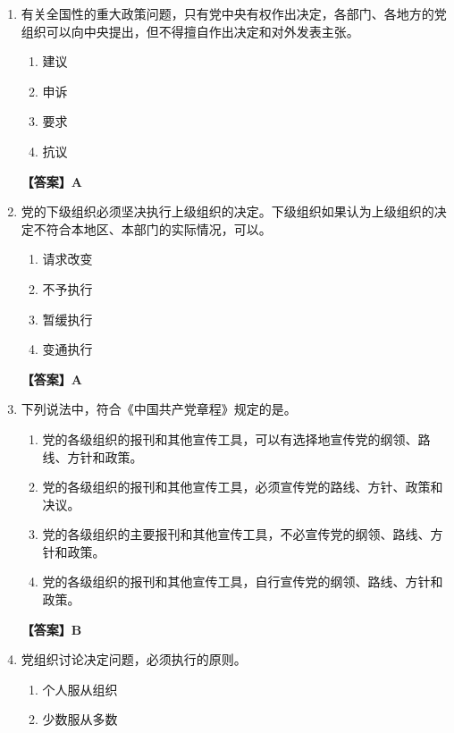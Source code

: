 \documentclass[UTF8,11pt,a4paper]{ctexart}
\begin{document}
\begin{enumerate}[label=\textbf{\arabic*.}, leftmargin=2.5em, itemsep=0.7em]
\item 有关全国性的重大政策问题，只有党中央有权作出决定，各部门、各地方的党组织可以向中央提出\allowbreak\underline{\hspace{4em}}，但不得擅自作出决定和对外发表主张。
\begin{enumerate}[label=\Alph*., leftmargin=2em, itemsep=0.1em, topsep=0.15em]
\item 建议
\item 申诉
\item 要求
\item 抗议
\end{enumerate}
\textbf{【答案】A}
\item 党的下级组织必须坚决执行上级组织的决定。下级组织如果认为上级组织的决定不符合本地区、本部门的实际情况，可以\allowbreak\underline{\hspace{4em}}。
\begin{enumerate}[label=\Alph*., leftmargin=2em, itemsep=0.1em, topsep=0.15em]
\item 请求改变
\item 不予执行
\item 暂缓执行
\item 变通执行
\end{enumerate}
\textbf{【答案】A}
\item 下列说法中，符合《中国共产党章程》规定的是\allowbreak\underline{\hspace{4em}}。
\begin{enumerate}[label=\Alph*., leftmargin=2em, itemsep=0.1em, topsep=0.15em]
\item 党的各级组织的报刊和其他宣传工具，可以有选择地宣传党的纲领、路线、方针和政策。
\item 党的各级组织的报刊和其他宣传工具，必须宣传党的路线、方针、政策和决议。
\item 党的各级组织的主要报刊和其他宣传工具，不必宣传党的纲领、路线、方针和政策。
\item 党的各级组织的报刊和其他宣传工具，自行宣传党的纲领、路线、方针和政策。
\end{enumerate}
\textbf{【答案】B}
\item 党组织讨论决定问题，必须执行\allowbreak\underline{\hspace{4em}}的原则。
\begin{enumerate}[label=\Alph*., leftmargin=2em, itemsep=0.1em, topsep=0.15em]
\item 个人服从组织
\item 少数服从多数

\end{enumerate}
\end{enumerate}
\end{document}
